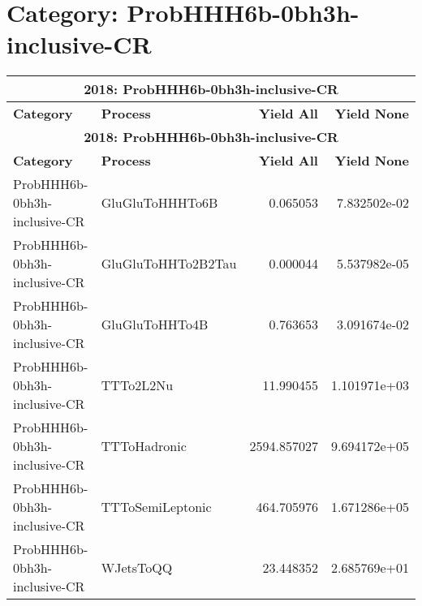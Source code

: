 \documentclass{article}
\begin{document}
\section*{Category: ProbHHH6b-0bh3h-inclusive-CR}
\begin{longtable}[c]{|l|l|r|r|}
\hline
\multicolumn{4}{|c|}{\textbf{2018: ProbHHH6b-0bh3h-inclusive-CR}} \\
\hline
\textbf{Category} & \textbf{Process} & \textbf{Yield All} & \textbf{Yield None} \\
\hline
\endfirsthead
\hline
\multicolumn{4}{|c|}{\textbf{2018: ProbHHH6b-0bh3h-inclusive-CR}} \\
\hline
\textbf{Category} & \textbf{Process} & \textbf{Yield All} & \textbf{Yield None} \\
\hline
\endhead
ProbHHH6b-0bh3h-inclusive-CR & GluGluToHHHTo6B & 0.065053 & 7.832502e-02 \\
\hline
ProbHHH6b-0bh3h-inclusive-CR & GluGluToHHTo2B2Tau & 0.000044 & 5.537982e-05 \\
\hline
ProbHHH6b-0bh3h-inclusive-CR & GluGluToHHTo4B & 0.763653 & 3.091674e-02 \\
\hline
ProbHHH6b-0bh3h-inclusive-CR & TTTo2L2Nu & 11.990455 & 1.101971e+03 \\
\hline
ProbHHH6b-0bh3h-inclusive-CR & TTToHadronic & 2594.857027 & 9.694172e+05 \\
\hline
ProbHHH6b-0bh3h-inclusive-CR & TTToSemiLeptonic & 464.705976 & 1.671286e+05 \\
\hline
ProbHHH6b-0bh3h-inclusive-CR & WJetsToQQ & 23.448352 & 2.685769e+01 \\
\hline
\end{longtable}
\end{document}
